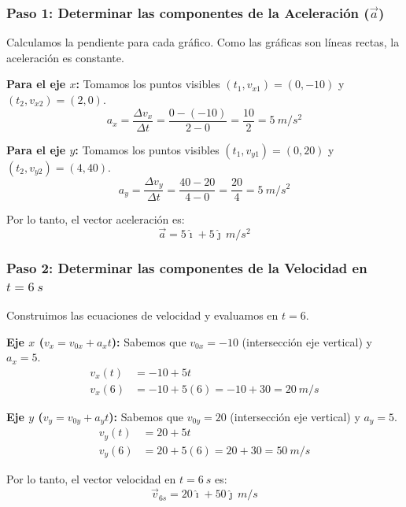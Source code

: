 \documentclass[12pt, a4paper]{article}
\begin{document}
\subsubsection*{Paso 1: Determinar las componentes de la Aceleración ($\vec{a}$)}
Calculamos la pendiente para cada gráfico. Como las gráficas son líneas rectas, la aceleración es constante.

\textbf{Para el eje $x$:}
Tomamos los puntos visibles $(t_1, v_{x1}) = (0, -10)$ y $(t_2, v_{x2}) = (2, 0)$.
\begin{equation}
a_x = \frac{\Delta v_x}{\Delta t} = \frac{0 - (-10)}{2 - 0} = \frac{10}{2} = \SI{5}{m/s^2}
\end{equation}

\textbf{Para el eje $y$:}
Tomamos los puntos visibles $(t_1, v_{y1}) = (0, 20)$ y $(t_2, v_{y2}) = (4, 40)$.
\begin{equation}
a_y = \frac{\Delta v_y}{\Delta t} = \frac{40 - 20}{4 - 0} = \frac{20}{4} = \SI{5}{m/s^2}
\end{equation}

Por lo tanto, el vector aceleración es:
\begin{equation}
\vec{a} = 5\hat{\imath} + 5\hat{\jmath} \, \si{m/s^2}
\end{equation}

\subsubsection*{Paso 2: Determinar las componentes de la Velocidad en $t = \SI{6}{s}$}
Construimos las ecuaciones de velocidad y evaluamos en $t=6$.

\textbf{Eje $x$ ($v_x = v_{0x} + a_x t$):}
Sabemos que $v_{0x} = -10$ (intersección eje vertical) y $a_x = 5$.
\begin{align*}
v_x(t) &= -10 + 5t \\
v_x(6) &= -10 + 5(6) = -10 + 30 = \SI{20}{m/s}
\end{align*}

\textbf{Eje $y$ ($v_y = v_{0y} + a_y t$):}
Sabemos que $v_{0y} = 20$ (intersección eje vertical) y $a_y = 5$.
\begin{align*}
v_y(t) &= 20 + 5t \\
v_y(6) &= 20 + 5(6) = 20 + 30 = \SI{50}{m/s}
\end{align*}

Por lo tanto, el vector velocidad en $t=\SI{6}{s}$ es:
\begin{equation}
\vec{v}_{6s} = 20\hat{\imath} + 50\hat{\jmath} \, \si{m/s}
\end{equation}
\end{document}

